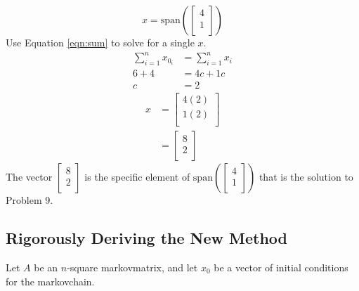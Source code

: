 \documentclass[titlepage]{article}
\newcommand{\spn}[1]{\text{span}\left( #1 \right)}
\begin{document}
\begin{equation*}
    x = \spn{
        \begin{bmatrix}
            4\\
            1\\
        \end{bmatrix}
    }
\end{equation*}
Use Equation \ref{eqn:sum} to solve for a single $x$.
\begin{align*}
    \sum_{i=1}^n x_{0_i} &= \sum_{i=1}^n x_i\\
    6+4 &= 4c+1c\\
    c &= 2
\end{align*}
\begin{align*}
    x &=
    \begin{bmatrix}
        4(2)\\
        1(2)\\
    \end{bmatrix}\\
    &=
    \begin{bmatrix}
        8\\
        2\\
    \end{bmatrix}
\end{align*}
The vector $
    \begin{bmatrix}
        8\\
        2\\
    \end{bmatrix}
$ is the specific element of $
    \spn{
        \begin{bmatrix}
            4\\
            1\\
        \end{bmatrix}
    }
$ that is the solution to Problem 9.


\subsection{Rigorously Deriving the New Method}\label{sss:rigorous}
Let $A$ be an $n$-square \Gls{markovmatrix}, and let $x_0$ be a vector of initial conditions for the \Gls{markovchain}.
\end{document}
